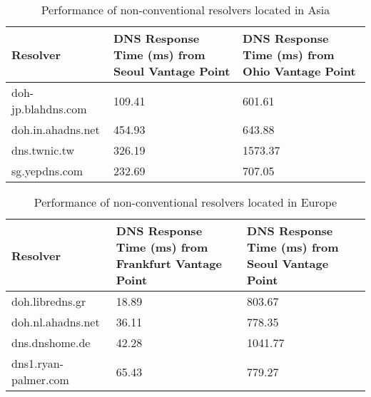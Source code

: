 \begin{table}[]
\begin{tabular}{lll}
\hline
\textbf{Resolver}  & \textbf{DNS Response Time (ms) from Seoul Vantage Point} & 
\textbf{DNS Response Time (ms) from Ohio Vantage Point}  \\ \hline
doh-jp.blahdns.com & 109.41                                                   & 601.61                                          \\ \hline
doh.in.ahadns.net  & 454.93                                                   & 643.88                                          \\ \hline
dns.twnic.tw       & 326.19                                                   & 1573.37                                         \\ \hline
sg.yepdns.com      & 232.69                                                   & 707.05                                          \\ \hline
\end{tabular}
\caption{Performance of non-conventional resolvers located in Asia}
\label{table:UnconvAsia}
\end{table}

\begin{table}[]
\begin{tabular}{lll}
\hline
\textbf{Resolver}    & \textbf{DNS Response Time (ms) from Frankfurt Vantage Point} & \textbf{DNS Response Time (ms) from Seoul Vantage Point} \\ \hline
doh.libredns.gr      & 18.89                                                        & 803.67                                          \\ \hline
doh.nl.ahadns.net    & 36.11                                                        & 778.35                                          \\ \hline
dns.dnshome.de       & 42.28                                                        & 1041.77                                         \\ \hline
dns1.ryan-palmer.com & 65.43                                                        & 779.27                                          \\ \hline
\end{tabular}
\caption{Performance of non-conventional resolvers located in Europe}
\label{table:UnconvEur}
\end{table}


